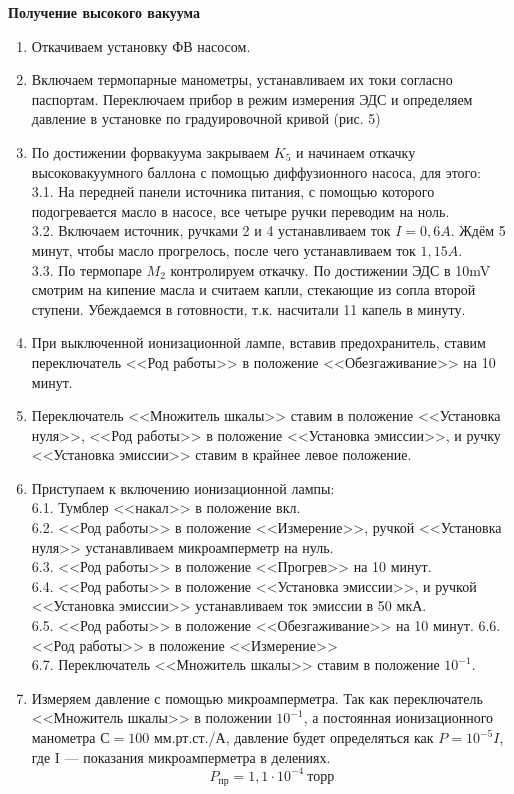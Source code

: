 \documentclass[a4paper, 12pt]{article}
\begin{document}
\textbf{Получение высокого вакуума}
	\begin{enumerate}
	\item Откачиваем установку ФВ насосом.
	\item Включаем термопарные манометры, устанавливаем их токи согласно паспортам. Переключаем прибор в режим измерения ЭДС и определяем давление в установке по градуировочной кривой (рис. 5)
	\item По достижении форвакуума закрываем $K_5$ и начинаем откачку высоковакуумного баллона с помощью диффузионного насоса, для этого:\\
	3.1. На передней панели источника питания, с помощью которого подогревается масло в насосе, все четыре ручки переводим на ноль.\\
	3.2. Включаем источник, ручками 2 и 4 устанавливаем ток $I = 0,6A$. Ждём 5 минут, чтобы масло прогрелось, после чего устанавливаем ток $1,15A$. \\
	3.3. По термопаре $M_2$ контролируем откачку. По достижении ЭДС в 10mV смотрим на кипение масла и считаем капли, стекающие из сопла второй ступени. Убеждаемся в готовности, т.к. насчитали 11 капель в минуту.
	\item При выключенной ионизационной лампе, вставив предохранитель, ставим переключатель <<Род работы>> в положение <<Обезгаживание>> на 10 минут.
	\item Переключатель <<Множитель шкалы>> ставим в положение <<Установка нуля>>, <<Род работы>> в положение <<Установка эмиссии>>, и ручку <<Установка эмиссии>> ставим в крайнее левое положение.
	\item Приступаем к включению ионизационной лампы: \\
	6.1. Тумблер <<накал>> в положение вкл. \\
	6.2. <<Род работы>> в положение <<Измерение>>, ручкой <<Установка нуля>> устанавливаем микроамперметр на нуль.\\
	6.3. <<Род работы>> в положение <<Прогрев>> на 10 минут. \\
	6.4. <<Род работы>> в положение <<Установка эмиссии>>, и ручкой <<Установка эмиссии>> устанавливаем ток эмиссии в 50 мкА. \\ 
	6.5. <<Род работы>> в положение <<Обезгаживание>> на 10 минут.
	6.6. <<Род работы>> в положение <<Измерение>> \\
	6.7. Переключатель <<Множитель шкалы>> ставим в положение $10^{-1}$. 
	\item Измеряем давление с помощью микроамперметра. Так как переключатель <<Множитель шкалы>> в положении $10^{-1}$, а постоянная ионизационного манометра $С = 100$ мм.рт.ст./А, давление будет определяться как $P = 10^{-5} I$, где I --- показания микроамперметра в делениях. \\
	$$P_{\text{пр}} = 1,1\cdot10^{-4} ~\text{торр}$$	
\end{enumerate}
\end{document}
